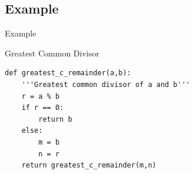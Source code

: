 \documentclass[aspectratio=169]{beamer}
\begin{document}
\subsection{Example}
\begin{frame}[fragile]{Example}
\begin{block}{Greatest Common Divisor}
\begin{lstlisting}[firstnumber=1, label=glabels, xleftmargin=10pt] 
def greatest_c_remainder(a,b):
	'''Greatest common divisor of a and b'''
	r = a % b
	if r == 0:
		return b
	else:
		m = b
		n = r
	return greatest_c_remainder(m,n)

\end{lstlisting}
\end{block}
\end{frame}
\end{document}

